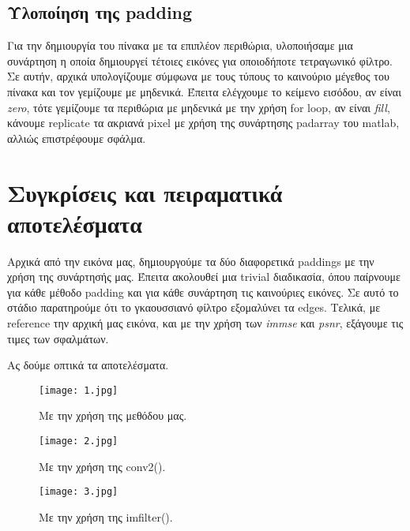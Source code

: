 \documentclass[11pt]{scrartcl} %
\begin{document}

\subsection{Υλοποίηση της padding}

Για την δημιουργία του πίνακα με τα επιπλέον περιθώρια, υλοποιήσαμε μια συνάρτηση η οποία δημιουργεί τέτοιες εικόνες για
οποιοδήποτε τετραγωνικό φίλτρο. Σε αυτήν, αρχικά υπολογίζουμε σύμφωνα με τους τύπους το καινούριο μέγεθος του πίνακα και
τον γεμίζουμε με μηδενικά. Έπειτα ελέγχουμε το κείμενο εισόδου, αν είναι \textit{zero}, τότε γεμίζουμε τα περιθώρια με μηδενικά
με την χρήση for loop, αν είναι \textit{fill}, κάνουμε replicate τα ακριανά pixel με χρήση της συνάρτησης padarray του
matlab, αλλιώς επιστρέφουμε σφάλμα.


\section{Συγκρίσεις και πειραματικά αποτελέσματα}

Αρχικά από την εικόνα μας, δημιουργούμε τα δύο διαφορετικά paddings με την χρήση της συνάρτησής μας. Έπειτα ακολουθεί
μια trivial διαδικασία, όπου παίρνουμε για κάθε μέθοδο padding και για κάθε συνάρτηση τις καινούριες εικόνες. Σε αυτό
το στάδιο παρατηρούμε ότι το γκαουσσιανό φίλτρο εξομαλύνει τα edges. Τελικά, με reference την αρχική μας εικόνα, και
με την χρήση των \textit{immse} και \textit{psnr}, εξάγουμε τις τιμες των σφαλμάτων.


Ας δούμε οπτικά τα αποτελέσματα.

\begin{figure}[h] %
	\centering
	\texttt{[image: 1.jpg]} %
	\caption{Με την χρήση της μεθόδου μας.}
\end{figure}

\begin{figure}[h] %
	\centering
	\texttt{[image: 2.jpg]} %
	\caption{Με την χρήση της conv2().}
\end{figure}

\begin{figure}[h] %
	\centering
	\texttt{[image: 3.jpg]} %
	\caption{Με την χρήση της imfilter().}
\end{figure}
\end{document}
